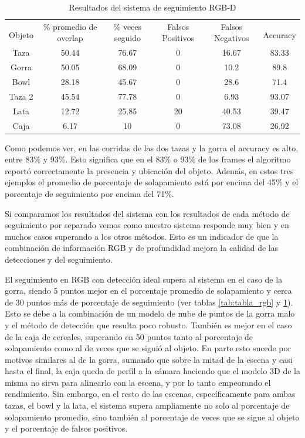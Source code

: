 \begin{table}[h]
	\centering
    \begin{tabular}{|c|c|c|c|c|c|}
    \hline
    & \multirow{2}{2.4cm}{\% promedio de overlap} & \multirow{2}{2cm}{\% veces seguido} & \multirow{2}{1.6cm}{Falsos Positivos} & \multirow{2}{1.6cm}{Falsos Negativos} &\\
	Objeto & & & & & Accuracy\\
	\hline
    Taza    & 50.44      & 76.67     &    0           & 16.67    & 83.33 \\
    \hline
    Gorra   & 50.05      & 68.09     &    0           &  10.2    & 89.8 \\
    \hline
    Bowl    & 28.18      & 45.67     &    0           &  28.6    & 71.4 \\
    \hline
    Taza 2  & 45.54      & 77.78     &    0           &  6.93    & 93.07 \\
    \hline
    Lata    & 12.72      & 25.85     &   20           & 40.53    & 39.47 \\
    \hline
    Caja    &  6.17      &    10     &    0           & 73.08    & 26.92 \\
    \hline
    \end{tabular}
\caption{Resultados del sistema de seguimiento RGB-D}
\label{tabla_sistema_rgbd}
\end{table}


Como podemos ver, en las corridas de las dos tazas y la gorra el accuracy es alto, entre 83\% y 93\%. Esto significa que en el 83\% o 93\% de los frames el algoritmo reportó correctamente la presencia y ubicación del objeto. Además, en estos tres ejemplos el promedio de porcentaje de solapamiento está por encima del 45\% y el porcentaje de seguimiento por encima del 71\%.

Si comparamos los resultados del sistema con los resultados de cada método de seguimiento por separado vemos como nuestro sistema responde muy bien y en muchos casos superando a los otros métodos. Esto es un indicador de que la combinación de información RGB y de profundidad mejora la calidad de las detecciones y del seguimiento.

El seguimiento en RGB con detección ideal supera al sistema en el caso de la gorra, siendo 5 puntos mejor en el porcentaje promedio de solapamiento y cerca de 30 puntos más de porcentaje de seguimiento (ver tablas \ref{tab:tabla_rgb} y \ref{tabla_sistema_rgbd}). Esto se debe a la combinación de un modelo de nube de puntos de la gorra malo y el método de detección que resulta poco robusto. También es mejor en el caso de la caja de cereales, superando en 50 puntos tanto al porcentaje de solapamiento como al de veces que se siguió al objeto. En parte esto sucede por motivos similares al de la gorra, sumando que sobre la mitad de la escena y casi hasta el final, la caja queda de perfil a la cámara haciendo que el modelo 3D de la misma no sirva para alinearlo con la escena, y por lo tanto empeorando el rendimiento. Sin embargo, en el resto de las escenas, específicamente para ambas tazas, el bowl y la lata, el sistema supera ampliamente no solo al porcentaje de solapamiento promedio, sino también al porcentaje de veces que se sigue al objeto y el porcentaje de falsos positivos.

